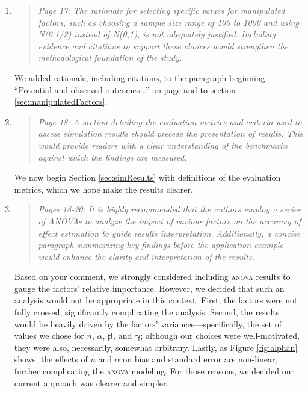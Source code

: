 \documentclass[]{article}
\newenvironment{itquote}
  {\begin{quote} \itshape}
  {\end{quote}\ignorespacesafterend}
\begin{document}
\begin{enumerate}
\item \begin{itquote}     Page 17: The rationale for selecting specific values for manipulated factors, such as choosing a sample size range of 100 to 1000 and using N(0,1/2) instead of N(0,1), is not adequately justified. Including evidence and citations to support these choices would strengthen the methodological foundation of the study.

\end{itquote}
We added rationale, including citations, to the paragraph beginning ``Potential and observed outcomes...'' on page \pageref{potential} and to section \ref{sec:manipulatedFactors}.

\item \begin{itquote}     Page 18: A section detailing the evaluation metrics and criteria used to assess simulation results should precede the presentation of results. This would provide readers with a clear understanding of the benchmarks against which the findings are measured.

\end{itquote}
We now begin Section \ref{sec:simResults} with definitions of the evaluation metrics, which we hope make the results clearer.

\item \begin{itquote}     Pages 18-20: It is highly recommended that the authors employ a series of ANOVAs to analyze the impact of various factors on the accuracy of effect estimation to guide results interpretation. Additionally, a concise paragraph summarizing key findings before the application example would enhance the clarity and interpretation of the results.
\end{itquote}
Based on your comment, we strongly considered including \textsc{anova} results to gauge the factors' relative importance. However, we decided that such an analysis would not be appropriate in this context. First, the factors were not fully crossed, significantly complicating the analysis. Second, the results would be heavily driven by the factors' variances---specifically, the set of values we chose for $n$, $\alpha$, $\bm\beta$, and $\bm\gamma$; although our choices were well-motivated, they were also, necessarily, somewhat arbitrary. 
Lastly, as Figure \ref{fig:alphan} shows, the effects of $n$ and $\alpha$ on bias and standard error are non-linear, further complicating the \textsc{anova} modeling. For those reasons, we decided our current approach was clearer and simpler.


\end{enumerate}
\end{document}
